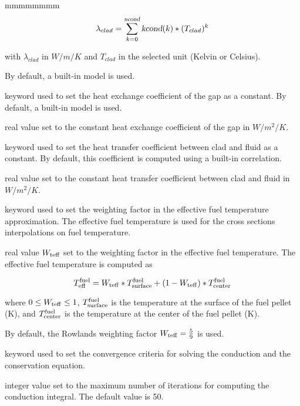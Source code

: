 \begin{ListeDeDescription}{mmmmmmmm}
$$\lambda_{clad} = \sum_{k=0}^{\dusa{ncond}} {\dusa{kcond}(k)*(T_{clad})^k}$$

with $\lambda_{clad}$ in $W/m/K$ and $T_{clad}$ in the selected unit (Kelvin or Celsius).

By default, a built-in model is used.

\item[\moc{HGAP}] keyword used to set the heat exchange coefficient of the gap as a constant.
By default, a built-in model is used.

\item[\dusa{hgap}] real value set to the constant heat exchange coefficient of the gap in $W/m^2/K$.

\item[\moc{HCONV}] keyword used to set the heat transfer coefficient between clad and fluid as a constant.
By default, this coefficient is computed using a built-in correlation.

\item[\dusa{hconv}] real value set to the constant heat transfer coefficient between clad and fluid in $W/m^2/K$.

\item[\moc{TEFF}] keyword used to set the weighting factor in the effective fuel temperature approximation.
The effective fuel temperature is used for the cross sections interpolations on fuel temperature.

\item[\dusa{wteff}] real value $W_{\rm teff}$ set to the weighting factor in the effective fuel temperature.
The effective fuel temperature is computed as

$$
T^{\rm fuel}_{\rm eff}=W_{\rm teff}*T^{\rm fuel}_{\rm surface}+(1-W_{\rm teff})*T^{\rm fuel}_{\rm center}
$$

where $0\le W_{\rm teff} \le 1$, $T^{\rm fuel}_{\rm surface}$ is the temperature at the surface of the fuel pellet (K), and $T^{\rm fuel}_{\rm center}$ is the temperature at the center of the fuel pellet (K).

By default, the Rowlands weighting factor $W_{\rm teff}={5 \over 9}$ is used\cite{Rowlands}.

\item[\moc{CONV}] keyword used to set the convergence criteria for solving the conduction and the conservation equation.

\item[\dusa{maxit1}] integer value set to the maximum number of iterations for computing the
conduction integral. The default value is 50.


\end{ListeDeDescription}
